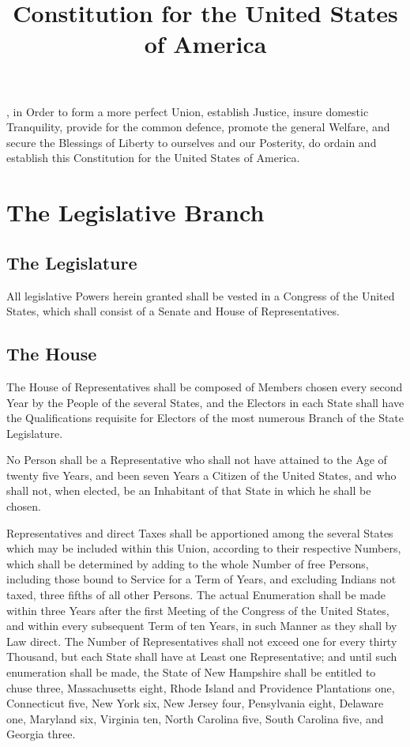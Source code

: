 \documentclass{constitution}
\title{Constitution for the United States of America}
\begin{document}
\maketitle
\tableofcontents*

\preamble
{} ,
in Order to form a more perfect Union, establish Justice, insure domestic Tranquility, provide for the common defence, promote the general Welfare, and secure the Blessings of Liberty to ourselves and our Posterity,
do ordain and establish this Constitution for the United States of America.

\chapter{The Legislative Branch}
\section{The Legislature}
All legislative Powers herein granted shall be vested in a Congress of the United States,
which shall consist of a Senate and House of Representatives.

\section{The House}
The House of Representatives shall be composed of Members chosen every second Year by the People of the several States,
and the Electors in each State shall have the Qualifications requisite for Electors of the most numerous Branch of the State Legislature.

No Person shall be a Representative who shall not have attained to the Age of twenty five Years,
and been seven Years a Citizen of the United States,
and who shall not, when elected, be an Inhabitant of that State in which he shall be chosen.

Representatives and direct Taxes shall be apportioned among the several States which may be included within this Union, according to their respective Numbers,
which shall be determined by adding to the whole Number of free Persons,
including those bound to Service for a Term of Years,
and excluding Indians not taxed,
three fifths of all other Persons.
The actual Enumeration shall be made within three Years after the first Meeting of the Congress of the United States, and within every subsequent Term of ten Years, in such Manner as they shall by Law direct.
The Number of Representatives shall not exceed one for every thirty Thousand,
but each State shall have at Least one Representative;
and until such enumeration shall be made, the State of New Hampshire shall be entitled to chuse three, Massachusetts eight, Rhode Island and Providence Plantations one, Connecticut five, New York six, New Jersey four, Pensylvania eight, Delaware one, Maryland six, Virginia ten, North Carolina five, South Carolina five, and Georgia three.
\end{document}
